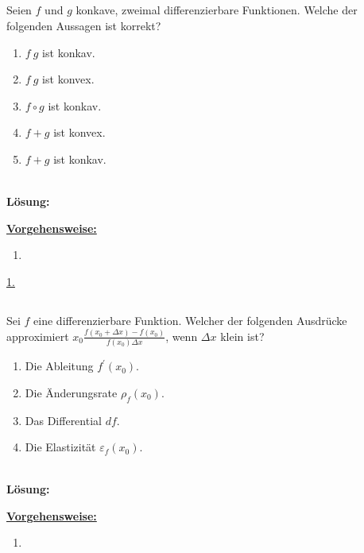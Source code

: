 \subsection*{}
Seien $f$ und $g$ konkave, zweimal differenzierbare Funktionen. Welche der folgenden Aussagen ist korrekt?
\renewcommand{\labelenumi}{(\alph{enumi})}
\begin{enumerate}
	\item 
	$f \ g$ ist konkav.
	\item
	$f \ g$ ist konvex.
	\item
	$f \circ g $ ist konkav.
	\item
	$f +g $ ist konvex.
	\item 
	$f+g$ ist konkav.
\end{enumerate}
\ \\
\textbf{Lösung:}
\begin{mdframed}
\underline{\textbf{Vorgehensweise:}}
\renewcommand{\labelenumi}{\theenumi.}
\begin{enumerate}
\item 
\end{enumerate}
\end{mdframed}

\underline{1. }\\



\newpage
\subsection*{}
Sei $f$ eine differenzierbare Funktion. Welcher der folgenden Ausdrücke approximiert 
$x_0 \frac{f(x_0 + \Delta x) - f(x_0)}{f(x_0) \Delta x}$, wenn $\Delta x$ klein ist?
\renewcommand{\labelenumi}{(\alph{enumi})}
\begin{enumerate}
	\item 
	Die Ableitung $f^\prime(x_0)$.
	\item
	Die Änderungsrate $\rho_f(x_0)$.	
	\item
	Das Differential $df$.
	\item
	Die Elastizität $\varepsilon_f(x_0)$.
\end{enumerate}
\ \\
\textbf{Lösung:}
\begin{mdframed}
	\underline{\textbf{Vorgehensweise:}}
	\renewcommand{\labelenumi}{\theenumi.}
	\begin{enumerate}
		\item 
	\end{enumerate}
\end{mdframed}

